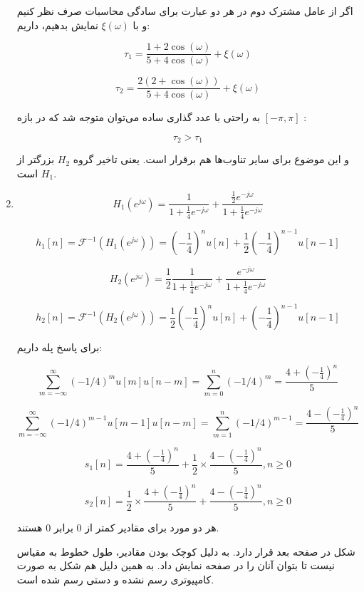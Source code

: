 \documentclass[12pt]{article}
\begin{document}
\begin{enumerate}
	اگر از عامل مشترک دوم در هر دو عبارت برای سادگی محاسبات صرف نظر کنیم و با $\xi(\omega)$ نمایش بدهیم، داریم:
	
	$$\tau_1 =\frac{1+ 2 \cos (\omega)}{5 + 4 \cos (\omega)} + \xi(\omega)$$
	
	$$\tau_2 = \frac{2(2 + \cos (\omega))}{5 + 4 \cos (\omega)} + \xi(\omega)$$
		
		به راحتی با عدد گذاری ساده می‌توان متوجه شد که در بازه
		 $[-\pi,\pi]$
		 :
		 
		$$\tau_2 > \tau_1$$
		
		و این موضوع برای سایر تناوب‌ها هم برقرار است.
		یعنی تاخیر گروه $H_2$ بزرگتر از $H_1$ است.
		
		\item
		
$$H_1(e^{j\omega}) = \frac{1}{1+\frac{1}{4} e^{-j \omega}} + \frac{\frac{1}{2}e^{-j \omega}}{1 + \frac{1}{4} e^{-j\omega}}$$

$$h_1[n] = \mathcal{F}^{-1}(H_1(e^{j \omega})) = (-\frac{1}{4})^n u[n] + \frac{1}{2} (-\frac{1}{4})^{n-1}u[n-1]$$


$$H_2(e^{j\omega}) = \frac{1}{2} \frac{1}{1+\frac{1}{4}e^{-j\omega}}+\frac{e^{-j\omega}}{1+\frac{1}{4}e^{-j\omega}}$$

$$h_2[n] = \mathcal{F}^{-1}(H_2(e^{j \omega})) = \frac{1}{2}(-\frac{1}{4})^n u[n] + (-\frac{1}{4})^{n-1}u[n-1]$$


برای پاسخ پله داریم:

$$\sum_{m=-\infty}^{\infty} (-1/4)^m u[m] u[n-m] = \sum_{m=0}^{n} (-1/4)^m = \frac{4+(-\frac{1}{4})^n}{5}$$



$$\sum_{m=-\infty}^{\infty} (-1/4)^{m-1} u[m-1] u[n-m] = \sum_{m=1}^{n} (-1/4)^{m-1} = \frac{4-(-\frac{1}{4})^{n}}{5}$$


$$s_1[n] = \frac{4+(-\frac{1}{4})^n}{5} + \frac{1}{2}\times \frac{4-(-\frac{1}{4})^{n}}{5} , n\geq 0$$

$$s_2[n] = \frac{1}{2} \times \frac{4+(-\frac{1}{4})^n}{5} + \frac{4-(-\frac{1}{4})^{n}}{5} , n \geq 0 $$

هر دو مورد برای مقادیر کمتر از $0$ برابر $0$ هستند.

شکل در صفحه بعد قرار دارد. به دلیل کوچک بودن مقادیر، طول خطوط به مقیاس نیست تا بتوان آنان را در صفحه نمایش داد. به همین دلیل هم شکل به صورت کامپیوتری رسم نشده و دستی رسم شده است.


\end{enumerate}
\end{document}
